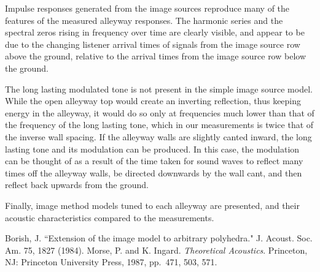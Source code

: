 \documentclass{aes137}
\begin{document}
Impulse responses generated from the image sources reproduce many of the features of the measured alleyway responses. The harmonic series and the spectral zeros rising in frequency over time are clearly visible, and appear to be due to the changing listener arrival times of signals from the image source row above the ground, relative to the arrival times from the image source row below the ground.

The long lasting modulated tone is not present in the simple image source model. While the open alleyway top would create an inverting reflection, thus keeping energy in the alleyway, it would do so only at frequencies much lower than that of the frequency of the long lasting tone, which in our measurements is twice that of the inverse wall spacing. If the alleyway walls are slightly canted inward, the long lasting tone and its modulation can be produced. In this case, the modulation can be thought of as a result of the time taken for sound waves to reflect many times off the alleyway walls, be directed downwards by the wall cant, and then reflect back upwards from the ground.

Finally, image method models tuned to each alleyway are presented, and their acoustic characteristics compared to the measurements.

%
%

\begin{thebibliography}{99}

Borish, J. ``Extension of the image model to arbitrary polyhedra." J. Acoust. Soc. Am. 75, 1827 (1984).
Morse, P. and K. Ingard. \emph{Theoretical Acoustics}. Princeton, NJ: Princeton University Press, 1987, pp.~471, 503, 571.

%
%
%
\end{thebibliography}
\end{document}
